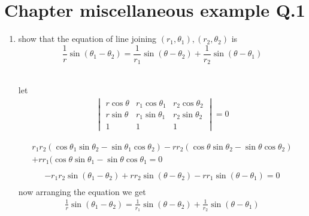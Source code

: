 \documentclass[journal,12pt,twocolumn]{IEEEtran}
\renewcommand\thesection{\arabic{section}}
\begin{document}
\section{ Chapter   miscellaneous example  Q.1}
\renewcommand{\theequation}{\theenumi}
\begin{enumerate}[label=\thesection.\arabic*.,ref=\thesection.\theenumi]
\item show that the equation of line joining $(r_1,\theta_1),(r_2,\theta_2)$
is $$ \frac{1}{r} \sin{(\theta_1-\theta_2)}=\frac{1}{r_1} \sin{(\theta-\theta_2)}+\frac{1}{r_2} \sin{(\theta-\theta_1)}$$\\
\solution

let \begin{align}
    \begin{vmatrix}
    r\cos\theta&r_1\cos\theta_1&r_2\cos\theta_2\\
    r\sin\theta&r_1\sin\theta_1&r_2\sin\theta_2\\
    1&1&1
    \end{vmatrix}
    =0
\end{align}

\begin{align}\nonumber
 r_1r_2(\cos\theta_1\sin\theta_2-\sin\theta_1\cos\theta_2)-rr_2(\cos\theta\sin\theta_2-\sin\theta\cos\theta_2)\\\nonumber
 +rr_1(\cos\theta\sin\theta_1-\sin\theta\cos\theta_1=0\\
\end{align}
\begin{align}
-r_1r_2\sin(\theta_1-\theta_2)+rr_2\sin(\theta-\theta_2)-rr_1\sin(\theta-\theta_1)=0\\\nonumber
\end{align}
now arranging the equation we get
\begin{align}
\frac{1}{r} \sin{(\theta_1-\theta_2)}=\frac{1}{r_1} \sin{(\theta-\theta_2)}+\frac{1}{r_2} \sin{(\theta-\theta_1)}
 \end{align}
\end{enumerate}
\end{document}
